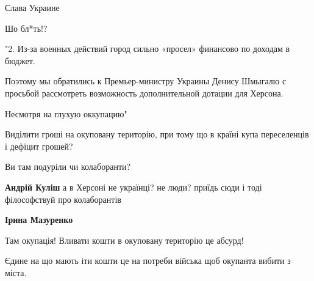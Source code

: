 \begin{itemize}










Слава Украине


Шо бл*ть!?

"2. Из-за военных действий город сильно «просел» финансово по доходам в бюджет.

Поэтому мы обратились к Премьер-министру Украины Денису Шмыгалю с просьбой
рассмотреть возможность дополнительной дотации для Херсона.

Несмотря на глухую оккупацию"

Виділити гроші на окуповану територію, при тому що в країні купа переселенців і
дефіцит грошей?

Ви там подуріли чи колаборанти?

\begin{itemize} %
\textbf{Андрій Куліш} а в Херсоні не українці? не люди? приїдь сюди і тоді філософствуй про колаборантів

\textbf{Ірина Мазуренко} 

Там окупація! Вливати кошти в окуповану територію це абсурд!

Єдине на що мають іти кошти це на потреби війська щоб окупанта вибити з міста.


\end{itemize}
\end{itemize}
